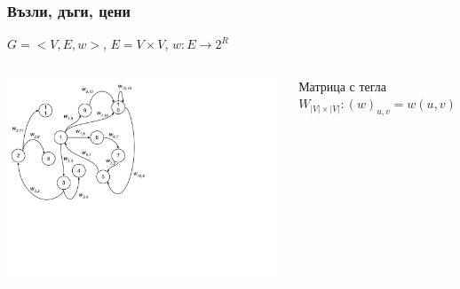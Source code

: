 \documentclass{beamer}
\begin{document}
\begin{frame}[fragile]
\frametitle{Възли, дъги, цени}

\begin{center}
  $G=<V,E,w>$, $E=V \times V$, $w:E \rightarrow 2^R$
\end{center}

\begin{columns}[t]
  \begin{column}{0.55\textwidth}
    \includegraphics[width=13cm]{images/graph_numbers_weight}
  \end{column}
  \begin{column}{0.45\textwidth}
    \begin{flushleft}

    \vspace{-250px}
      Матрица с тегла
      $W_{|V|\times|V|}:(w)_{u,v}=w(u,v)$
      
    \end{flushleft}
  \end{column}
\end{columns}



\end{frame}
\end{document}
